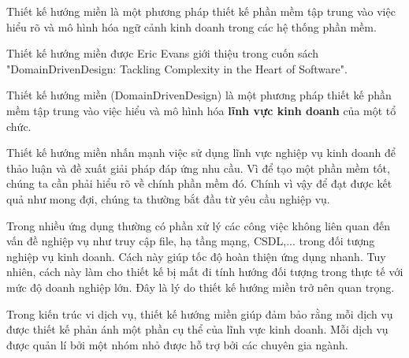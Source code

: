 Thiết kế hướng miền là một phương pháp thiết kế phần mềm tập trung vào việc hiểu rõ và mô hình hóa ngữ cảnh kinh doanh trong các hệ thống phần mềm.

Thiết kế hướng miền được Eric Evans giới thiệu trong cuốn sách "DomainDrivenDesign: Tackling Complexity in the Heart of Software".

Thiết kế hướng miền (DomainDrivenDesign) là một phương pháp thiết kế phần mềm tập trung vào việc hiểu và mô hình hóa \textbf{lĩnh vực kinh doanh} của một tổ chức.

Thiết kế hướng miền nhấn mạnh việc sử dụng lĩnh vực nghiệp vụ kinh doanh để thảo luận và đề xuất giải pháp đáp ứng nhu cầu. Vì để tạo một phần mềm tốt, chúng ta cần phải hiểu rõ về chính phần mềm đó. Chính vì vậy để đạt được kết quả như mong đợi, chúng ta thường bắt đầu từ yêu cầu nghiệp vụ.

Trong nhiều ứng dụng thường có phần xử lý các công việc không liên quan đến vấn đề nghiệp vụ như truy cập file, hạ tầng mạng, CSDL,... trong đối tượng nghiệp vụ kinh doanh. Cách này giúp tốc độ hoàn thiện ứng dụng nhanh. Tuy nhiên, cách này làm cho thiết kế bị mất đi tính hướng đối tượng trong thực tế với mức độ doanh nghiệp lớn. Đây là lý do thiết kế hướng miền trở nên quan trọng.

Trong kiến trúc vi dịch vụ, thiết kế hướng miền giúp đảm bảo rằng mỗi dịch vụ được thiết kế phản ánh một phần cụ thể của lĩnh vực kinh doanh. Mỗi dịch vụ được quản lí bởi một nhóm nhỏ được hỗ trợ bởi các chuyên gia ngành.



